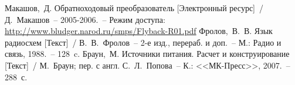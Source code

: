 \begin{thebibliography}{9}
	 Макашов,~Д. Обратноходовый преобразователь [Электронный ресурс]~/
	Д.~Макашов~-- 2005-2006.~-- Режим доступа:
	\href{http://www.bludger.narod.ru/smps/Flyback-R01.pdf}
	{http://www.bludger.narod.ru/smps/Flyback-R01.pdf}
	 Фролов,~В.~В. Язык радиосхем [Текст]~/ В.~В.~Фролов~-- 2-е изд., перераб.
	и доп.~-- М.: Радио и связь, 1988.~-- 128~c.
	 Браун,~М. Источники питания. Расчет и конструирование [Текст]~/
	М.~Браун; пер. с англ. С.~Л.~Попова~-- К.: <<МК-Пресс>>, 2007.~-- 288~с.
\end{thebibliography}

